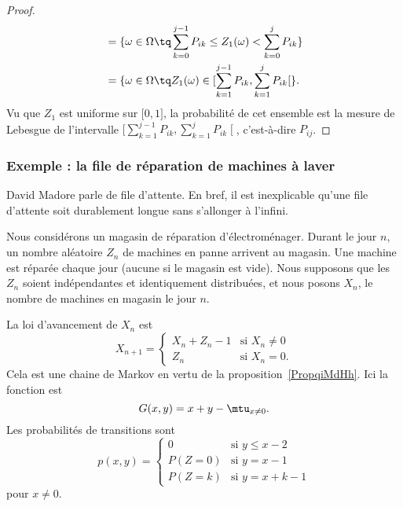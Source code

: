 \begin{proof}
\begin{subequations}
\begin{align}
			                 & =\{ \omega\in\Omega\tq \sum_{k=0}^{j-1}P_{ik}\leq Z_1(\omega)<\sum_{k=0}^{j}P_{ik} \}                                   \\
			                 & =\{ \omega\in\Omega\tq Z_1(\omega)\in\mathopen\lbrack \sum_{k=1}^{j-1}P_{ik} , \sum_{k=1}^jP_{ik} \mathclose\lbrack \}.
		\end{align}
	\end{subequations}
	Vu que \( Z_1\) est uniforme sur \( \mathopen[ 0 , 1 \mathclose]\), la probabilité de cet ensemble est la mesure de Lebesgue de l'intervalle \( \mathopen[ \sum_{k=1}^{j-1}P_{ik} , \sum_{k=1}^jP_{ik} \mathclose[\), c'est-à-dire \( P_{ij}\).
\end{proof}

\subsubsection{Exemple : la file de réparation de machines à laver}

\begin{normaltext}
	David Madore parle de file d'attente\cite{BIBooOSYQooOLuSYF}. En bref, il est inexplicable qu'une file d'attente soit durablement longue sans s'allonger à l'infini.
\end{normaltext}

Nous considérons un magasin de réparation d'électroménager. Durant le jour \( n\), un nombre aléatoire \( Z_{n}\) de machines en panne arrivent au magasin. Une machine est réparée chaque jour (aucune si le magasin est vide). Nous supposons que les \( Z_n\) soient indépendantes et identiquement distribuées, et nous posons \( X_n\), le nombre de machines en magasin le jour \( n\).

La loi d'avancement de \( X_n\) est
\begin{equation}
	X_{n+1}=\begin{cases}
		X_n+Z_n-1 & \text{si } X_n\neq 0 \\
		Z_n       & \text{si } X_n=0.
	\end{cases}
\end{equation}
Cela est une chaine de Markov en vertu de la proposition~\ref{PropqiMdHh}. Ici la fonction est
\begin{equation}
	G(x,y)=x+y-\mtu_{x\neq 0}.
\end{equation}
Les probabilités de transitions sont
\begin{equation}
	p(x,y)=\begin{cases}
		0      & \text{si } y\leq x-2 \\
		P(Z=0) & \text{si } y=x-1     \\
		P(Z=k) & \text{si } y=x+k-1
	\end{cases}
\end{equation}
pour \( x\neq 0\).


